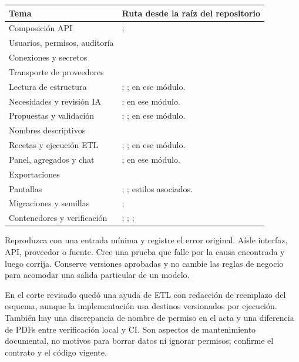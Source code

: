 {\small
\begin{tabularx}{\linewidth}{@{}p{40mm}Y@{}}
\toprule
\textbf{Tema}&\textbf{Ruta desde la raíz del repositorio}\\
\midrule
Composición API&; \\
Usuarios, permisos, auditoría&\\
Conexiones y secretos&\\
Transporte de proveedores&\\
Lectura de estructura&; ;  en ese módulo.\\
Necesidades y revisión IA&;  en ese módulo.\\
Propuestas y validación&; ;  en ese módulo.\\
Nombres descriptivos&\\
Recetas y ejecución ETL&; ;  en ese módulo.\\
Panel, agregados y chat&;  en ese módulo.\\
Exportaciones&\\
Pantallas&; ; estilos asociados.\\
Migraciones y semillas&; \\
Contenedores y verificación&; ; ; \\
\bottomrule
\end{tabularx}}
Reproduzca con una entrada mínima y registre el error original. Aísle interfaz, API, proveedor o fuente. Cree una prueba que falle por la causa encontrada y luego corrija. Conserve versiones aprobadas y no cambie las reglas de negocio para acomodar una salida particular de un modelo.
\begin{note}
En el corte revisado quedó una ayuda de ETL con redacción de reemplazo del esquema, aunque la implementación usa destinos versionados por ejecución. También hay una discrepancia de nombre de permiso en el acta y una diferencia de PDFs entre verificación local y CI. Son aspectos de mantenimiento documental, no motivos para borrar datos ni ignorar permisos; confirme el contrato y el código vigente.
\end{note}

